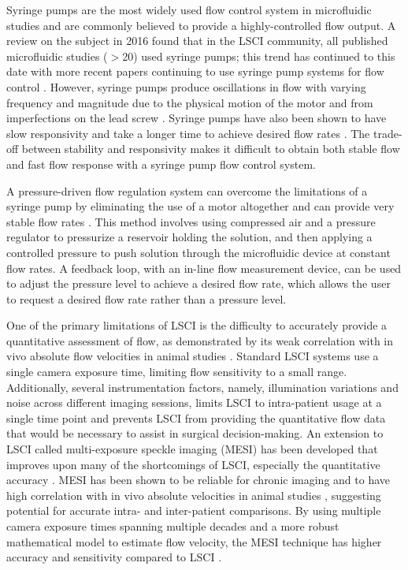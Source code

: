 \documentclass[12pt]{spieman}
\begin{document}
\begin{spacing}{2}
Syringe pumps are the most widely used flow control system in microfluidic studies and are commonly believed to provide a highly-controlled flow output. A review on the subject in 2016 \cite{Richards.2015} found that in the LSCI community, all published microfluidic studies ($>$20) used syringe pumps; this trend has continued to this date with more recent papers continuing to use syringe pump systems for flow control \cite{Zheng:2018ct,Yang.2019}. However, syringe pumps produce oscillations in flow with varying frequency and magnitude due to the physical motion of the motor and from imperfections on the lead screw \cite{Korczyk:2010eu,Li:2014ca}. Syringe pumps have also been shown to have slow responsivity and take a longer time to achieve desired flow rates \cite{Zhou:2011ey}. The trade-off between stability and responsivity makes it difficult to obtain both stable flow and fast flow response with a syringe pump flow control system.

A pressure-driven flow regulation system can overcome the limitations of a syringe pump by eliminating the use of a motor altogether and can provide very stable flow rates \cite{Korczyk:2010eu,Li:2014ca,Zhou:2011ey}. This method involves using compressed air and a pressure regulator to pressurize a reservoir holding the solution, and then applying a controlled pressure to push solution through the microfluidic device at constant flow rates. A feedback loop, with an in-line flow measurement device, can be used to adjust the pressure level to achieve a desired flow rate, which allows the user to request a desired flow rate rather than a pressure level.

One of the primary limitations of LSCI is the difficulty to accurately provide a quantitative assessment of flow, as demonstrated by its weak correlation with in vivo absolute flow velocities in animal studies \cite{Kazmi:2013hp}. Standard LSCI systems use a single camera exposure time, limiting flow sensitivity to a small range. Additionally, several instrumentation factors, namely, illumination variations and noise across different imaging sessions, limits LSCI to intra-patient usage at a single time point and prevents LSCI from providing the quantitative flow data that would be necessary to assist in surgical decision-making. An extension to LSCI called multi-exposure speckle imaging (MESI) has been developed that improves upon many of the shortcomings of LSCI, especially the quantitative accuracy \cite{Parthasarathy:2008el}. MESI has been shown to be reliable for chronic imaging and to have high correlation with in vivo absolute velocities in animal studies \cite{Kazmi:2013hp}, suggesting potential for accurate intra- and inter-patient comparisons. By using multiple camera exposure times spanning multiple decades and a more robust mathematical model to estimate flow velocity, the MESI technique has higher accuracy and sensitivity compared to LSCI \cite{Parthasarathy:2008el}.


\end{spacing}
\end{document}
